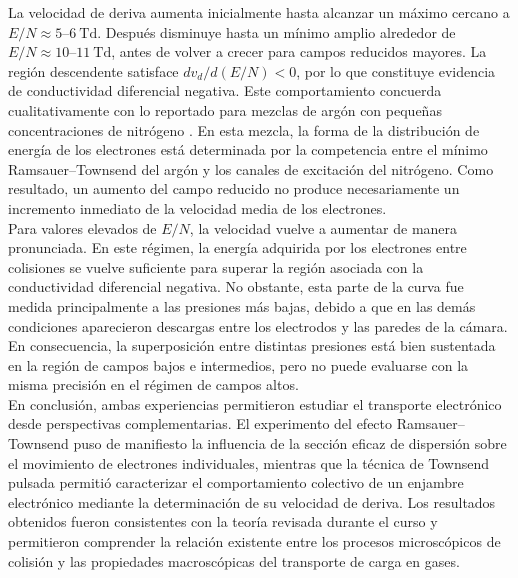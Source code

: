 La velocidad de deriva aumenta inicialmente hasta alcanzar un máximo cercano
a $E/N\approx 5$--$6~\mathrm{Td}$. Después disminuye hasta un mínimo amplio
alrededor de $E/N\approx 10$--$11~\mathrm{Td}$, antes de volver a crecer para
campos reducidos mayores. La región descendente satisface
$
    d v_d/d(E/N)<0
$, 
por lo que constituye evidencia de conductividad diferencial negativa. Este
comportamiento concuerda cualitativamente con lo reportado para mezclas de
argón con pequeñas concentraciones de nitrógeno \cite{Jovanovic2009}. En esta
mezcla, la forma de la distribución de energía de los electrones está
determinada por la competencia entre el mínimo Ramsauer--Townsend del argón
y los canales de excitación del nitrógeno. Como resultado, un aumento del
campo reducido no produce necesariamente un incremento inmediato de la
velocidad media de los electrones.\\

Para valores elevados de $E/N$, la velocidad vuelve a aumentar de manera
pronunciada. En este régimen, la energía adquirida por los electrones entre
colisiones se vuelve suficiente para superar la región asociada con la
conductividad diferencial negativa. No obstante, esta parte de la curva fue
medida principalmente a las presiones más bajas, debido a que en las demás
condiciones aparecieron descargas entre los electrodos y las paredes de la
cámara. En consecuencia, la superposición entre distintas presiones está
bien sustentada en la región de campos bajos e intermedios, pero no puede
evaluarse con la misma precisión en el régimen de campos altos.\\

En conclusión, ambas experiencias permitieron estudiar el transporte electrónico desde perspectivas complementarias. El experimento del efecto Ramsauer--Townsend puso de manifiesto la influencia de la sección eficaz de dispersión sobre el movimiento de electrones individuales, mientras que la técnica de Townsend pulsada permitió caracterizar el comportamiento colectivo de un enjambre electrónico mediante la determinación de su velocidad de deriva. Los resultados obtenidos fueron consistentes con la teoría revisada durante el curso y permitieron comprender la relación existente entre los procesos microscópicos de colisión y las propiedades macroscópicas del transporte de carga en gases.